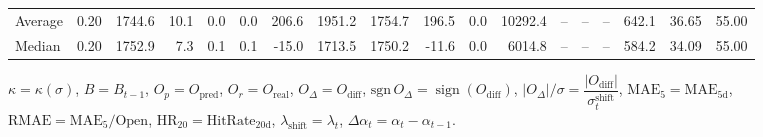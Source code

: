 \begin{threeparttable}
{\begin{tabular}{lrrrrrrrrrrrrrrrrr}
Average &     0.20 & 1744.6 &              10.1 &               0.0 &                0.0 &              206.6 & 1951.2 & 1754.7 &      196.5 &                      0.0 &             10292.4 &         -- &        -- &             -- &            642.1 &           36.65 &                  55.00 \\
 Median &     0.20 & 1752.9 &               7.3 &               0.1 &                0.1 &              -15.0 & 1713.5 & 1750.2 &      -11.6 &                      0.0 &              6014.8 &         -- &        -- &             -- &            584.2 &           34.09 &                  55.00 \\
\bottomrule
\end{tabular}
}
\begin{tablenotes}\footnotesize
\item $\kappa=\kappa(\sigma)$, $B=B_{t-1}$, $O_p=O_{\text{pred}}$, $O_r=O_{\text{real}}$, $O_\Delta=O_{\text{diff}}$, $\mathrm{sgn}\,O_\Delta=\operatorname{sign}(O_{\text{diff}})$, $|O_\Delta|/\sigma=\dfrac{|O_{\text{diff}}|}{\sigma_t^{\text{shift}}}$, $\mathrm{MAE}_5=\mathrm{MAE}_{5\text{d}}$, $\mathrm{RMAE}= \mathrm{MAE}_5 / \text{Open}$, $\mathrm{HR}_{20}=\mathrm{HitRate}_{20\text{d}}$, 
$\lambda_{\text{shift}}=\lambda_t$, 
$\Delta\alpha_t=\alpha_t-\alpha_{t-1}$.
\end{tablenotes}
\end{threeparttable}
\endgroup

